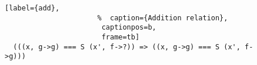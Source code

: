 \begin{figure}[!t]
  \centering
  \begin{minipage}{\columnwidth}
    \begin{lstlisting}[label={add},
                      %  caption={Addition relation},
                       captionpos=b,
                       frame=tb]
  (((x, g->g) === S (x', f->?)) => ((x, g->g) === S (x', f->g)))
    \end{lstlisting}
  \end{minipage}
\end{figure}